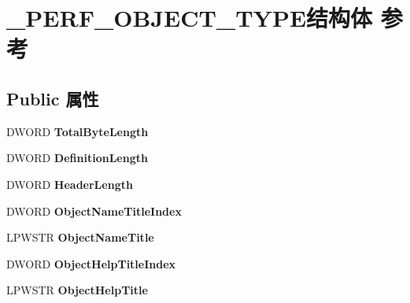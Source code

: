 \hypertarget{struct___p_e_r_f___o_b_j_e_c_t___t_y_p_e}{}\section{\+\_\+\+P\+E\+R\+F\+\_\+\+O\+B\+J\+E\+C\+T\+\_\+\+T\+Y\+P\+E结构体 参考}
\label{struct___p_e_r_f___o_b_j_e_c_t___t_y_p_e}
\subsection*{Public 属性}
\begin{DoxyCompactItemize}
\item 
\mbox{\label{struct___p_e_r_f___o_b_j_e_c_t___t_y_p_e_a6f447c91880cdc8277fe36154ce123ca}} 
D\+W\+O\+RD {\bfseries Total\+Byte\+Length}
\item 
\mbox{\label{struct___p_e_r_f___o_b_j_e_c_t___t_y_p_e_a78d716928e617726362b69d52e51c175}} 
D\+W\+O\+RD {\bfseries Definition\+Length}
\item 
\mbox{\label{struct___p_e_r_f___o_b_j_e_c_t___t_y_p_e_af99b2e19f04232a74140bb82743dfc4e}} 
D\+W\+O\+RD {\bfseries Header\+Length}
\item 
\mbox{\label{struct___p_e_r_f___o_b_j_e_c_t___t_y_p_e_aff9bad86385486fedd1d2a6a5f7ef254}} 
D\+W\+O\+RD {\bfseries Object\+Name\+Title\+Index}
\item 
\mbox{\label{struct___p_e_r_f___o_b_j_e_c_t___t_y_p_e_a3bd55e6a4f64f17d813a2ddd03d4f434}} 
L\+P\+W\+S\+TR {\bfseries Object\+Name\+Title}
\item 
\mbox{\label{struct___p_e_r_f___o_b_j_e_c_t___t_y_p_e_ad256a91ad234be944879473ba18c7acd}} 
D\+W\+O\+RD {\bfseries Object\+Help\+Title\+Index}
\item 
\mbox{\label{struct___p_e_r_f___o_b_j_e_c_t___t_y_p_e_a20378e9457c6eb92709a2e8975c793f9}} 
L\+P\+W\+S\+TR {\bfseries Object\+Help\+Title}

\end{DoxyCompactItemize}
